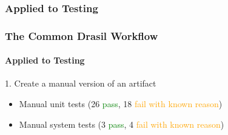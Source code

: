 \documentclass{beamer}
\begin{document}
\subsubsection*{Applied to Testing}

\begin{frame}
    \frametitle{The Common Drasil Workflow}
    \framesubtitle{Applied to Testing}

    1. Create a manual version of an artifact
    \begin{itemize}
        \item Manual unit tests (26 \textcolor{green}{pass}, 18 \textcolor{orange}{fail with known reason})
        \item<5-|handout:4> Manual system tests (3 \textcolor{green}{pass}, 4 \textcolor{orange}{fail with known reason})
    \end{itemize}
    \begin{overprint}
        \centering
        \begin{figure}
            \centering
            
        \end{figure}
        \begin{figure}
            \centering
            
        \end{figure}
        \begin{figure}
            \centering
            

\end{figure}
\end{overprint}
\end{frame}
\end{document}
